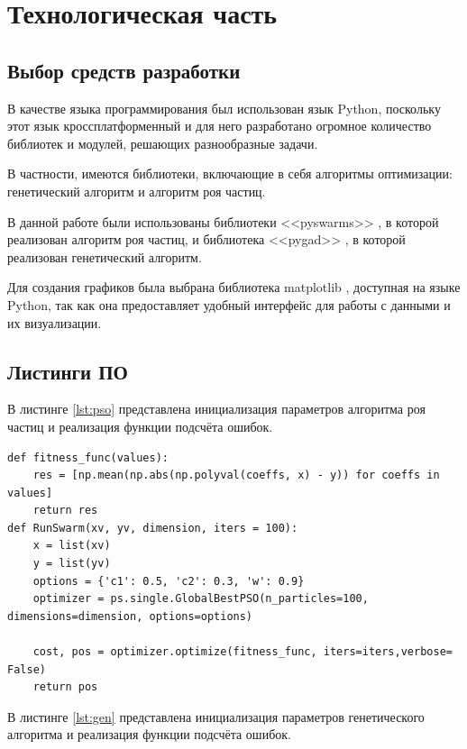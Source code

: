 \documentclass[12pt]{report}
\begin{document}
\chapter{Технологическая часть}

\section{Выбор средств разработки}
В качестве языка программирования был использован язык Python, поскольку этот язык кроссплатформенный и для него разработано огромное количество библиотек и модулей, решающих разнообразные задачи. 

В частности, имеются библиотеки, включающие в себя алгоритмы оптимизации: генетический алгоритм и алгоритм роя частиц. 

В данной работе были использованы библиотеки <<pyswarms>> \cite{bib:pyswarms}, в которой реализован алгоритм роя частиц, и библиотека <<pygad>> \cite{bib:pygad}, в которой реализован генетический алгоритм.

Для создания графиков была выбрана библиотека matplotlib \cite{bib:14}, доступная на языке Python, так как она предоставляет удобный интерфейс для работы с данными и их визуализации.

\section{Листинги ПО}

В листинге \ref{lst:pso} представлена инициализация параметров алгоритма роя частиц и реализация функции подсчёта ошибок.

\begin{lstlisting}[label=lst:pso,caption=Инициализация параметров алгоритма роя частиц]
def fitness_func(values):
    res = [np.mean(np.abs(np.polyval(coeffs, x) - y)) for coeffs in values]
    return res
def RunSwarm(xv, yv, dimension, iters = 100):
    x = list(xv)
    y = list(yv)
    options = {'c1': 0.5, 'c2': 0.3, 'w': 0.9}           
    optimizer = ps.single.GlobalBestPSO(n_particles=100, dimensions=dimension, options=options)

    cost, pos = optimizer.optimize(fitness_func, iters=iters,verbose= False)
    return pos

\end{lstlisting}

В листинге \ref{lst:gen} представлена инициализация параметров генетического алгоритма и реализация функции подсчёта ошибок.
\end{document}
